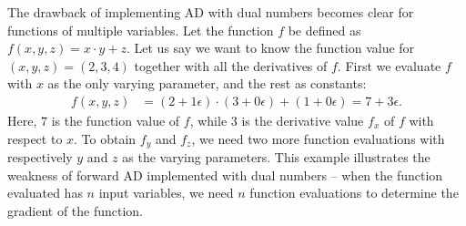 The drawback of implementing AD with dual numbers becomes clear for functions of multiple variables. Let the function $f$ be defined as $f(x,y,z) = x\cdot y + z$. Let us say we want to know the function value for $(x,y,z) = (2,3,4)$ together with all the derivatives of $f$. First we evaluate $f$ with $x$ as the only varying parameter, and the rest as constants:
\begin{align*}
    f(x,y,z) &= (2+1\epsilon)\cdot(3+0\epsilon) + (1+0\epsilon)%
        =7+3\epsilon.
\end{align*}
Here, $7$ is the function value of $f$, while $3$ is the derivative value $f_x$ of $f$ with respect to $x$. To obtain $f_y$ and $f_z$, we need two more function evaluations with respectively $y$ and $z$ as the varying parameters. This example illustrates the weakness of forward AD implemented with dual numbers -- when the function evaluated has $n$ input variables, we need $n$ function evaluations to determine the gradient of the function.


